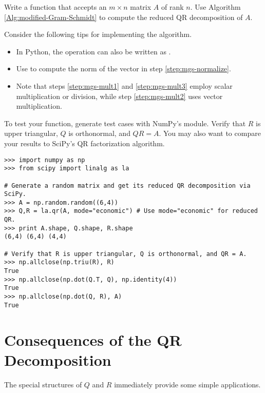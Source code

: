 \begin{problem} %
Write a function that accepts an $m \times n$ matrix $A$ of rank $n$.
Use Algorithm \ref{Alg:modified-Gram-Schmidt} to compute the reduced QR decomposition of $A$.

Consider the following tips for implementing the algorithm.
\begin{itemize}

\item In Python, the operation  can also be written as .

\item Use  to compute the norm of the vector in step \ref{step:mgs-normalize}.

\item Note that steps \ref{step:mgs-mult1} and \ref{step:mgs-mult3} employ scalar multiplication or division, while step \ref{step:mgs-mult2} uses vector multiplication.

\end{itemize}

To test your function, generate test cases with NumPy's  module.
Verify that $R$ is upper triangular, $Q$ is orthonormal, and $QR = A$.
You may also want to compare your results to SciPy's QR factorization algorithm.

\begin{lstlisting}
>>> import numpy as np
>>> from scipy import linalg as la

# Generate a random matrix and get its reduced QR decomposition via SciPy.
>>> A = np.random.random((6,4))
>>> Q,R = la.qr(A, mode="economic") # Use mode="economic" for reduced QR.
>>> print A.shape, Q.shape, R.shape
(6,4) (6,4) (4,4)

# Verify that R is upper triangular, Q is orthonormal, and QR = A.
>>> np.allclose(np.triu(R), R)
True
>>> np.allclose(np.dot(Q.T, Q), np.identity(4))
True
>>> np.allclose(np.dot(Q, R), A)
True
\end{lstlisting}
\label{prob:qr-via-mgs}
\end{problem}

\newpage

\section*{Consequences of the QR Decomposition} %

The special structures of $Q$ and $R$ immediately provide some simple applications.

